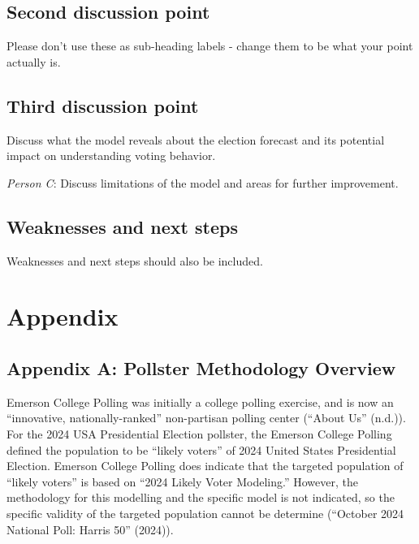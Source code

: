 \documentclass[
  letterpaper,
  DIV=11,
  numbers=noendperiod]{scrartcl}
\begin{document}
\subsection{Second discussion point}\label{second-discussion-point}

Please don't use these as sub-heading labels - change them to be what
your point actually is.

\subsection{Third discussion point}\label{third-discussion-point}

Discuss what the model reveals about the election forecast and its
potential impact on understanding voting behavior.

\emph{Person C}: Discuss limitations of the model and areas for further
improvement.

\subsection{Weaknesses and next steps}\label{weaknesses-and-next-steps}

Weaknesses and next steps should also be included.

\newpage

\appendix

\section*{Appendix}\label{appendix}

\subsection{Appendix A: Pollster Methodology
Overview}\label{appendix-a-pollster-methodology-overview}

Emerson College Polling was initially a college polling exercise, and is
now an ``innovative, nationally-ranked'' non-partisan polling center
({``About Us''} (n.d.)). For the 2024 USA Presidential Election
pollster, the Emerson College Polling defined the population to be
``likely voters'' of 2024 United States Presidential Election. Emerson
College Polling does indicate that the targeted population of ``likely
voters'' is based on ``2024 Likely Voter Modeling.'' However, the
methodology for this modelling and the specific model is not indicated,
so the specific validity of the targeted population cannot be determine
({``October 2024 National Poll: Harris 50''} (2024)).
\end{document}
